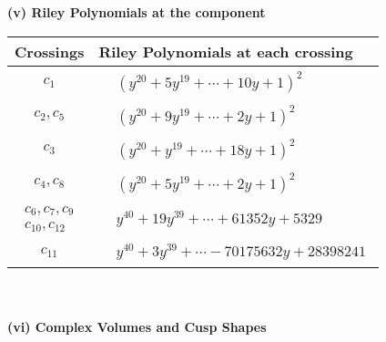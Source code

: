 \documentclass[1p]{elsarticle_modified}
\theoremstyle{definition}
\begin{document}
\newpage\renewcommand{\arraystretch}{1}
\flushleft \textbf{(v) Riley Polynomials at the component}\newline \\
\begin{tabular}{m{50pt}|m{274pt}}
Crossings & \hspace{64pt}Riley Polynomials at each crossing \\
\hline $$\begin{aligned}c_{1}\end{aligned}$$&$\begin{aligned}
&(y^{20}+5 y^{19}+\cdots+10 y+1)^{2}
\end{aligned}$\\
\hline $$\begin{aligned}c_{2},c_{5}\end{aligned}$$&$\begin{aligned}
&(y^{20}+9 y^{19}+\cdots+2 y+1)^{2}
\end{aligned}$\\
\hline $$\begin{aligned}c_{3}\end{aligned}$$&$\begin{aligned}
&(y^{20}+y^{19}+\cdots+18 y+1)^{2}
\end{aligned}$\\
\hline $$\begin{aligned}c_{4},c_{8}\end{aligned}$$&$\begin{aligned}
&(y^{20}+5 y^{19}+\cdots+2 y+1)^{2}
\end{aligned}$\\
\hline $$\begin{aligned}c_{6},c_{7},c_{9}\\c_{10},c_{12}\end{aligned}$$&$\begin{aligned}
&y^{40}+19 y^{39}+\cdots+61352 y+5329
\end{aligned}$\\
\hline $$\begin{aligned}c_{11}\end{aligned}$$&$\begin{aligned}
&y^{40}+3 y^{39}+\cdots-70175632 y+28398241
\end{aligned}$\\
\hline
\end{tabular}\\~\\
\newpage\flushleft \textbf{(vi) Complex Volumes and Cusp Shapes}
\end{document}
